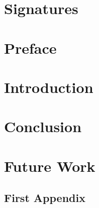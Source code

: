 






\thispagestyle{empty}
\cleardoublepage


\chapter*{Signatures}


\newpage
\thispagestyle{empty}
\mbox{}

\chapter*{Preface}
\thispagestyle{empty}


\newpage
\thispagestyle{empty}
\mbox{}

\newpage
\thispagestyle{empty}
\mbox{}

\setcounter{secnumdepth}{3}
\setcounter{tocdepth}{1}

\tableofcontents*

\acresetall %

\chapter{Introduction}\label{chap:intro}





\chapter{Conclusion}
\label{chap:conclusion}

\chapter{Future Work}


\begin{appendices}
\chapter{First Appendix}\label{appendixStart}
\label{appendixEnd}
\end{appendices}

